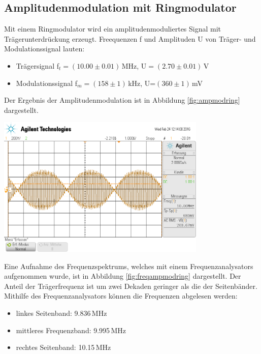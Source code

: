 \documentclass[]{scrartcl}
\begin{document}
\subsection{Amplitudenmodulation mit Ringmodulator}
Mit einem Ringmodulator wird ein amplitudenmoduliertes Signal mit Trägerunterdrückung erzeugt. Freequenzen f und Amplituden U von Träger- und Modulationssignal lauten:
\begin{itemize}
	\item Trägersignal f$_t=(10.00\pm0.01)$\,MHz, U$=(2.70\pm0.01)$\,V
	\item Modulationssignal f$_m=(158\pm1)$\,kHz, U=$(360\pm1)$\,mV
\end{itemize}
Der Ergebnis der Amplitudenmodulation ist in Abbildung \ref{fig:ampmodring} dargestellt.
\begin{center}
	\includegraphics[width=10cm]{images/ampmodring.png}
	\label{fig:ampmodring}
\end{center}
Eine Aufnahme des Frequenzspektrums, welches mit einem Frequenzanalysators aufgenommen wurde, ist in Abbildung \ref{fig:freqampmodring} dargestellt. Der Anteil der Trägerfrequenz ist um zwei Dekaden geringer als die der Seitenbänder.
Mithilfe des Frequenzanalysators können die Frequenzen abgelesen werden:
\begin{itemize}
	\item linkes Seitenband: 9.836\,MHz
	\item mittleres Frequenzband: 9.995\,MHz
	\item rechtes Seitenband: 10.15\,MHz
\end{itemize} 
\end{document}
